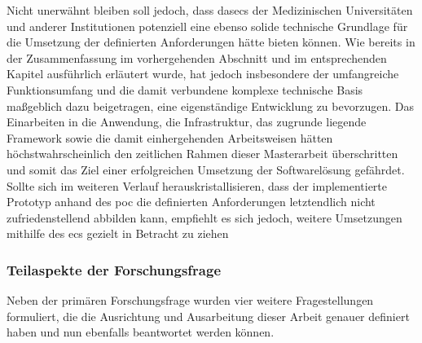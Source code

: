 \documentclass[a4paper,12pt,twoside]{scrreprt}
\begin{document}
Nicht unerwähnt bleiben soll jedoch, dass das\ac{ecs} der Medizinischen Universitäten und anderer Institutionen potenziell eine ebenso solide technische Grundlage für die Umsetzung der definierten Anforderungen hätte bieten können. Wie bereits in der Zusammenfassung im vorhergehenden Abschnitt und im entsprechenden Kapitel ausführlich erläutert wurde, hat jedoch insbesondere der umfangreiche Funktionsumfang und die damit verbundene komplexe technische Basis maßgeblich dazu beigetragen, eine eigenständige Entwicklung zu bevorzugen. Das Einarbeiten in die Anwendung, die Infrastruktur, das zugrunde liegende Framework sowie die damit einhergehenden Arbeitsweisen hätten höchstwahrscheinlich den zeitlichen Rahmen dieser Masterarbeit überschritten und somit das Ziel einer erfolgreichen Umsetzung der Softwarelösung gefährdet. Sollte sich im weiteren Verlauf herauskristallisieren, dass der implementierte Prototyp anhand des \ac{poc} die definierten Anforderungen letztendlich nicht zufriedenstellend abbilden kann, empfiehlt es sich jedoch, weitere Umsetzungen mithilfe des \acl{ecs} gezielt in Betracht zu ziehen


\subsubsection*{Teilaspekte der Forschungsfrage}

Neben der primären Forschungsfrage wurden vier weitere Fragestellungen formuliert, die die Ausrichtung und Ausarbeitung dieser Arbeit genauer definiert haben und nun ebenfalls beantwortet werden können.

\medskip
\end{document}
